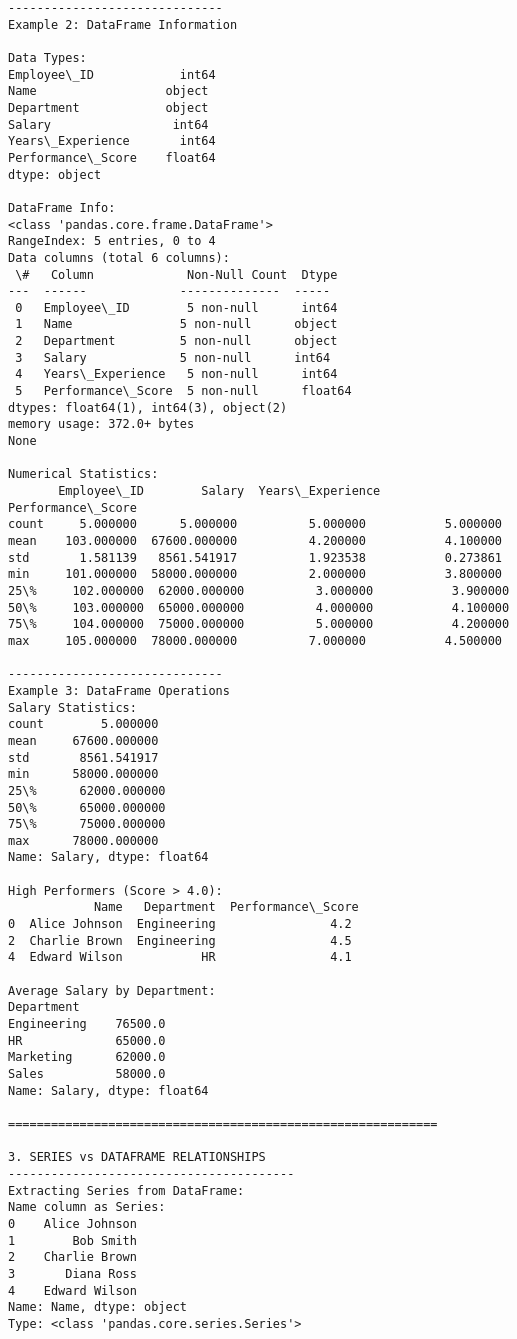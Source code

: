 \documentclass[11pt]{article}
\begin{document}
\begin{Verbatim}[commandchars=\\\{\}]
------------------------------
Example 2: DataFrame Information

Data Types:
Employee\_ID            int64
Name                  object
Department            object
Salary                 int64
Years\_Experience       int64
Performance\_Score    float64
dtype: object

DataFrame Info:
<class 'pandas.core.frame.DataFrame'>
RangeIndex: 5 entries, 0 to 4
Data columns (total 6 columns):
 \#   Column             Non-Null Count  Dtype
---  ------             --------------  -----
 0   Employee\_ID        5 non-null      int64
 1   Name               5 non-null      object
 2   Department         5 non-null      object
 3   Salary             5 non-null      int64
 4   Years\_Experience   5 non-null      int64
 5   Performance\_Score  5 non-null      float64
dtypes: float64(1), int64(3), object(2)
memory usage: 372.0+ bytes
None

Numerical Statistics:
       Employee\_ID        Salary  Years\_Experience  Performance\_Score
count     5.000000      5.000000          5.000000           5.000000
mean    103.000000  67600.000000          4.200000           4.100000
std       1.581139   8561.541917          1.923538           0.273861
min     101.000000  58000.000000          2.000000           3.800000
25\%     102.000000  62000.000000          3.000000           3.900000
50\%     103.000000  65000.000000          4.000000           4.100000
75\%     104.000000  75000.000000          5.000000           4.200000
max     105.000000  78000.000000          7.000000           4.500000

------------------------------
Example 3: DataFrame Operations
Salary Statistics:
count        5.000000
mean     67600.000000
std       8561.541917
min      58000.000000
25\%      62000.000000
50\%      65000.000000
75\%      75000.000000
max      78000.000000
Name: Salary, dtype: float64

High Performers (Score > 4.0):
            Name   Department  Performance\_Score
0  Alice Johnson  Engineering                4.2
2  Charlie Brown  Engineering                4.5
4  Edward Wilson           HR                4.1

Average Salary by Department:
Department
Engineering    76500.0
HR             65000.0
Marketing      62000.0
Sales          58000.0
Name: Salary, dtype: float64

============================================================

3. SERIES vs DATAFRAME RELATIONSHIPS
----------------------------------------
Extracting Series from DataFrame:
Name column as Series:
0    Alice Johnson
1        Bob Smith
2    Charlie Brown
3       Diana Ross
4    Edward Wilson
Name: Name, dtype: object
Type: <class 'pandas.core.series.Series'>


\end{Verbatim}
\end{document}
